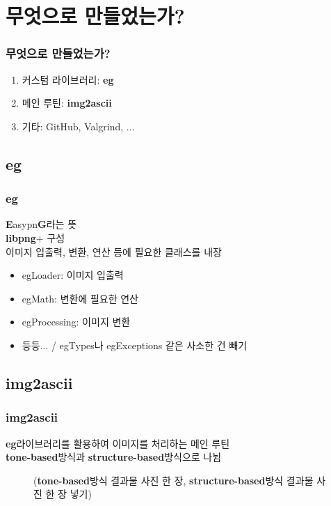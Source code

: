 \documentclass{beamer}
\newcommand{\spacing}{\hspace{0.3em}}
\newcommand{\eg}{\textbf{eg}}
\newcommand{\imgascii}{\textbf{img2ascii}}
\newcommand{\libpng}{\textbf{libpng}}
\newcommand{\Eigen}{\textbf{Eigen}}
\newcommand{\tonebased}{\textbf{tone-based}}
\newcommand{\structurebased}{\textbf{structure-based}}
\begin{document}
\section{무엇으로 만들었는가?}
\begin{frame}{}
	\frametitle{무엇으로 만들었는가?}
	\begin{enumerate}
		\item 커스텀 라이브러리: \eg
		\item 메인 루틴: \imgascii
		\item 기타: GitHub, Valgrind, ...
	\end{enumerate}
\end{frame}

	\subsection{\eg}
	\begin{frame}{}
		\frametitle{\eg}
		\textbf{E}asypn\textbf{G}라는 뜻 \\
		\libpng \spacing +  구성 \\
		이미지 입출력, 변환, 연산 등에 필요한 클래스를 내장
		\vspace{1em}
		\begin{itemize}
			\item egLoader: 이미지 입출력
			\item egMath: 변환에 필요한 연산
			\item egProcessing: 이미지 변환
			\item 등등... / egTypes나 egExceptions 같은 사소한 건 빼기
		\end{itemize}
	\end{frame}

	\subsection{\imgascii}
	\begin{frame}{}
		\frametitle{\imgascii}
		\eg \spacing 라이브러리를 활용하여 이미지를 처리하는 메인 루틴 \\
		\tonebased \spacing 방식과 \structurebased \spacing 방식으로 나뉨
		\begin{figure}
			(\tonebased \spacing 방식 결과물 사진 한 장, \structurebased \spacing 방식 결과물 사진 한 장 넣기)
		\end{figure}
	\end{frame}
\end{document}
